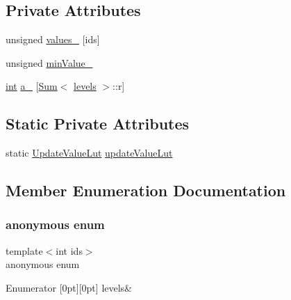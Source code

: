\subsection*{Private Attributes}
\begin{DoxyCompactItemize}
\item 
unsigned \hyperlink{classMinKeeper_a7096c3993486cb56ee56b7434282a5cc}{values\+\_\+} \mbox{[}ids\mbox{]}
\item 
unsigned \hyperlink{classMinKeeper_a5701ef91dc989316dfa7992c19b03ca9}{min\+Value\+\_\+}
\item 
\hyperlink{ioapi_8h_a787fa3cf048117ba7123753c1e74fcd6}{int} \hyperlink{classMinKeeper_ac5ddfd149ad4ff5b944a98ccf4b1e6cd}{a\+\_\+} \mbox{[}\hyperlink{structMinKeeper_1_1Sum}{Sum}$<$ \hyperlink{classMinKeeper_a745fcad4766af72248c4f26e8fb5b754aea945fa5cad053f00154ef3bf621ea51}{levels} $>$\+::r\mbox{]}
\end{DoxyCompactItemize}
\subsection*{Static Private Attributes}
\begin{DoxyCompactItemize}
\item 
static \hyperlink{classMinKeeper_1_1UpdateValueLut}{Update\+Value\+Lut} \hyperlink{classMinKeeper_a63181263fc50994bef542275e0962ff0}{update\+Value\+Lut}
\end{DoxyCompactItemize}


\subsection{Member Enumeration Documentation}
\mbox{\label{classMinKeeper_a745fcad4766af72248c4f26e8fb5b754}} 
\subsubsection{\texorpdfstring{anonymous enum}{anonymous enum}}
{\footnotesize\ttfamily template$<$int ids$>$ \\
anonymous enum\hspace{0.3cm}{\ttfamily [private]}}

\begin{DoxyEnumFields}{Enumerator}
[0pt][0pt]{}\mbox{\label{classMinKeeper_a745fcad4766af72248c4f26e8fb5b754aea945fa5cad053f00154ef3bf621ea51}} 
levels&\\
\hline

\end{DoxyEnumFields}


